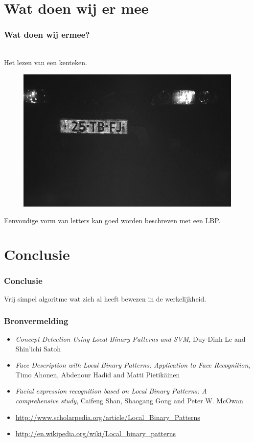 \documentclass{beamer}
\begin{document}
	\section{Wat doen wij er mee}
		\begin{frame}
			\frametitle{Wat doen wij ermee?}
			\\
			Het lezen van een kenteken.
			\begin{figure}
				\includegraphics[scale=0.2]{00991_000000.jpg}
			\end{figure}
			Eenvoudige vorm van letters kan goed worden beschreven met een LBP.
		\end{frame}
		
	\section{Conclusie}
		\begin{frame}
			\frametitle{Conclusie}
			Vrij simpel algoritme wat zich al heeft bewezen in de werkelijkheid.
		\end{frame}
		
		\begin{frame}
			\frametitle{Bronvermelding}
			\begin{itemize}
				\item \emph{Concept Detection Using Local Binary Patterns and SVM}, Duy-Dinh Le and Shin’ichi Satoh
				\item \emph{Face Description with Local Binary Patterns: Application to Face Recognition}, Timo Ahonen, 	
					Abdenour Hadid and Matti Pietik\"ainen
				\item \emph{Facial expression recognition based on Local Binary Patterns: A comprehensive study}, Caifeng 
					Shan, Shaogang Gong and Peter W. McOwan
				\item \url{http://www.scholarpedia.org/article/Local_Binary_Patterns}
				\item \url{http://en.wikipedia.org/wiki/Local_binary_patterns}
			\end{itemize}
		\end{frame}
	
\end{document}
